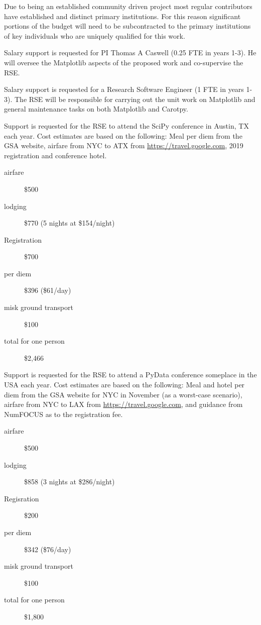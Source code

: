 \documentclass[12pt]{article}
\numberwithin{page}{section}
\begin{document}
Due to being an established community driven project most regular
contributors have established and distinct primary institutions.  For
this reason significant portions of the budget will need to be
subcontracted to the primary institutions of key individuals who are
uniquely qualified for this work.

Salary support is requested for PI Thomas A Caswell (0.25 FTE in years
1-3).  He will oversee the Matplotlib aspects of the proposed work and
co-supervise the RSE.

Salary support is requested for a Research Software Engineer (1 FTE in
years 1-3).  The RSE will be responsible for carrying out the unit
work on Matplotlib and general maintenance tasks on both Matplotlib
and Carotpy.

Support is requested for the RSE to attend the SciPy conference in
Austin, TX each year.  Cost estimates are based on the following: Meal
per diem from the GSA website, airfare from NYC to ATX from
\url{https://travel.google.com}, 2019 registration and conference hotel.

\begin{description}
\item[airfare] \$500
\item [lodging] \$770 (5 nights at \$154/night)
\item [Registration] \$700
\item [per diem] \$396 (\$61/day)
\item [misk ground transport] \$100
\item [total for one person] \$2,466
\end{description}

Support is requested for the RSE to attend a PyData conference
someplace in the USA each year.  Cost estimates are based on the
following: Meal and hotel per diem from the GSA website for NYC in
November (as a worst-case scenario), airfare from NYC to LAX from
\url{https://travel.google.com}, and guidance from NumFOCUS as to the
registration fee.


\begin{description}
\item [airfare] \$500
\item [lodging] \$858 (3 nights at \$286/night)
\item [Regisration] \$200
\item [per diem] \$342 (\$76/day)
\item [misk ground transport] \$100
\item [total for one person] \$1,800
\end{description}
\end{document}
